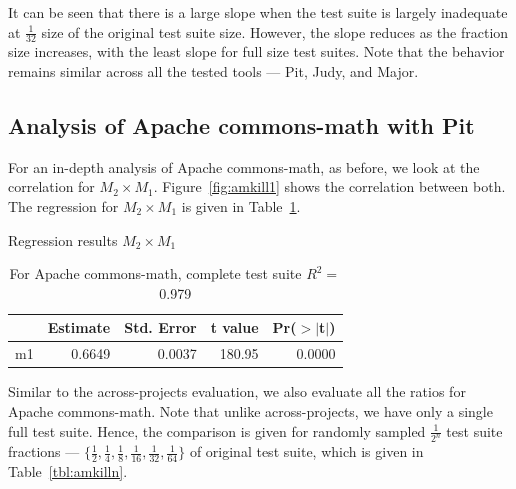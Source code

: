 \documentclass[conference]{IEEEtran}
\begin{document}
It can be seen that there is a large slope when the test suite is
largely inadequate at $\frac{1}{32}$ size of the original test suite size.
However, the slope reduces as the fraction size increases, with the least slope for
full size test suites. Note that the  behavior remains similar across all the
tested tools --- Pit, Judy, and Major.
\subsection{Analysis of Apache commons-math with Pit}
For an in-depth analysis of Apache commons-math, as before, we look at the
correlation for $M_2 \times M_1$. Figure~\ref{fig:amkill1} shows the
correlation between both.
The regression for $M_2\times M_1$ is given in Table~\ref{tbl:amkill1}.
\begin{table}
\centering
\caption{Regression results $M_2\times M_1$}
{\small
\begin{tabular}{rrrrr}
  \hline
 & Estimate & Std. Error & t value & Pr($>$$|$t$|$) \\ 
  \hline
m1 & 0.6649 & 0.0037 & 180.95 & 0.0000 \\ 
   \hline
\end{tabular}
}


\caption*{For Apache commons-math, complete test suite $R^2=$0.979}
\label{tbl:amkill1}
\end{table}
Similar to the across-projects evaluation, we also evaluate all the ratios
for Apache commons-math. Note that
unlike across-projects, we have only a single full test suite. Hence, the
comparison is given for randomly sampled $\frac{1}{2^n}$ test suite fractions ---
$\{\frac{1}{2},\frac{1}{4},\frac{1}{8},\frac{1}{16},\frac{1}{32},\frac{1}{64}\}$
of original test suite, which is given in Table~\ref{tbl:amkilln}.
\end{document}
